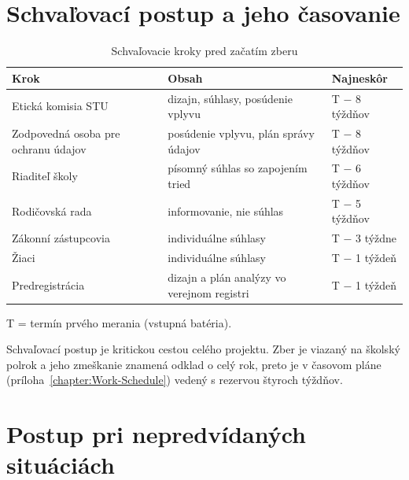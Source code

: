 \section{Schvaľovací postup a jeho časovanie}

\begin{table}[H]
\centering
\caption{Schvaľovacie kroky pred začatím zberu}
\label{tab:schvalenia}
\small
\begin{tabularx}{\textwidth}{@{}l X l@{}}
\toprule
\textbf{Krok} & \textbf{Obsah} & \textbf{Najneskôr} \\
\midrule
Etická komisia STU & dizajn, súhlasy, posúdenie vplyvu & T $-$ 8 týždňov \\
Zodpovedná osoba pre ochranu údajov & posúdenie vplyvu, plán správy údajov & T $-$ 8 týždňov \\
Riaditeľ školy & písomný súhlas so zapojením tried & T $-$ 6 týždňov \\
Rodičovská rada & informovanie, nie súhlas & T $-$ 5 týždňov \\
Zákonní zástupcovia & individuálne súhlasy & T $-$ 3 týždne \\
Žiaci & individuálne súhlasy & T $-$ 1 týždeň \\
Predregistrácia & dizajn a plán analýzy vo verejnom registri & T $-$ 1 týždeň \\
\bottomrule
\end{tabularx}
\vspace{2pt}
\footnotesize T = termín prvého merania (vstupná batéria).
\end{table}

Schvaľovací postup je kritickou cestou celého projektu. Zber je viazaný na školský polrok a jeho zmeškanie znamená odklad o celý rok, preto je v časovom pláne (príloha~\ref{chapter:Work-Schedule}) vedený s rezervou štyroch týždňov.

\section{Postup pri nepredvídaných situáciách}

